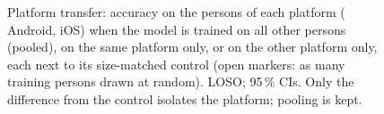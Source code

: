\begin{figure}[htbp]
\centering
{}
\caption{Platform transfer: accuracy on the persons of each platform ( Android,
 iOS) when the model is trained on all other persons (pooled), on the same platform
only, or on the other platform only, each next to its size-matched control (open markers: as many training
persons drawn at random). LOSO; 95\,\% CIs. Only the difference from the control isolates the platform;
pooling is kept.}
\label{fig:P1_08_platform}\label{fig:app:prep-platform}
\end{figure}

